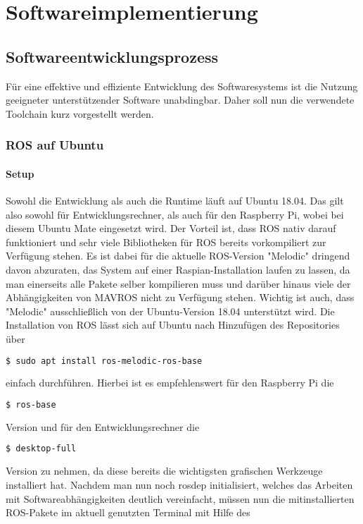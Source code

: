 \chapter{Softwareimplementierung}
\section{Softwareentwicklungsprozess}
Für eine effektive und effiziente Entwicklung des Softwaresystems ist die Nutzung geeigneter unterstützender Software unabdingbar. Daher soll nun die verwendete Toolchain kurz vorgestellt werden.
\subsection{ROS auf Ubuntu}
\subsubsection{Setup} Sowohl die Entwicklung als auch die Runtime läuft auf Ubuntu 18.04. Das gilt also sowohl für Entwicklungsrechner, als auch für den Raspberry Pi, wobei bei diesem Ubuntu Mate eingesetzt wird. Der Vorteil ist, dass ROS nativ darauf funktioniert und sehr viele Bibliotheken für ROS bereits vorkompiliert zur Verfügung stehen. Es ist dabei für die aktuelle ROS-Version "Melodic" dringend davon abzuraten, das System auf einer Raspian-Installation laufen zu lassen, da man einerseits alle Pakete selber kompilieren muss und darüber hinaus viele der Abhängigkeiten von MAVROS nicht zu Verfügung stehen. Wichtig ist auch, dass "Melodic" ausschließlich von der Ubuntu-Version 18.04 unterstützt wird. Die Installation von ROS lässt sich auf Ubuntu nach Hinzufügen des Repositories über 

\begin{lstlisting}[language=bash]
$ sudo apt install ros-melodic-ros-base
\end{lstlisting}

einfach durchführen. Hierbei ist es empfehlenswert für den Raspberry Pi die 

\begin{lstlisting}[language=bash]
$ ros-base
\end{lstlisting}

Version und für den Entwicklungsrechner die 

\begin{lstlisting}[language=bash]
$ desktop-full
\end{lstlisting}

Version zu nehmen, da diese bereits die wichtigsten grafischen Werkzeuge installiert hat. Nachdem man nun noch rosdep initialisiert, welches das Arbeiten mit Softwareabhängigkeiten deutlich vereinfacht, müssen nun die mitinstallierten ROS-Pakete im aktuell genutzten Terminal mit Hilfe des 

